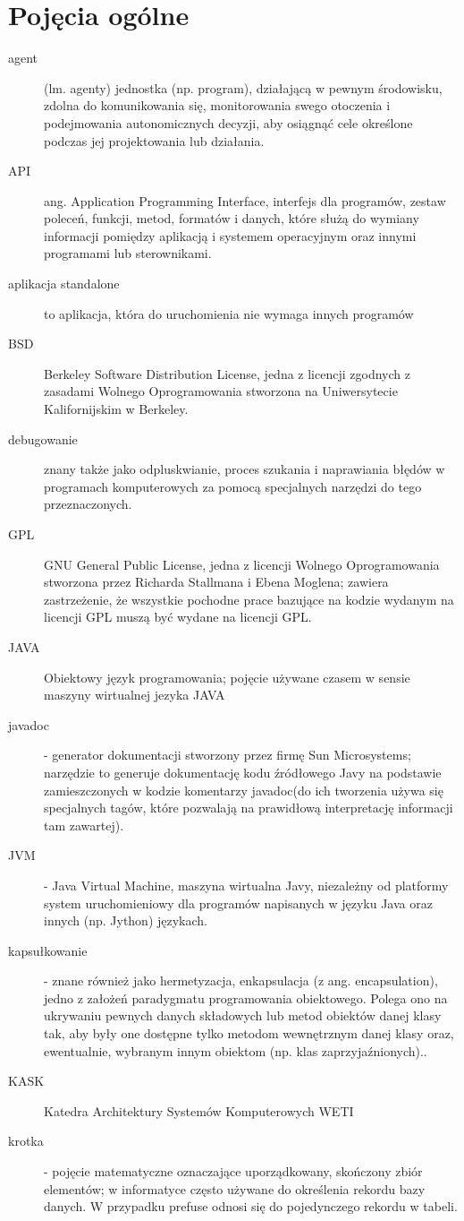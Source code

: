 \documentclass[a4paper,10pt]{article}
\begin{document}
\section{Pojęcia ogólne}
\begin{description}
	\item[agent] (lm. agenty) jednostka (np. program), działającą w pewnym środowisku, zdolna do komunikowania się, monitorowania swego otoczenia i podejmowania autonomicznych decyzji, aby osiągnąć cele określone podczas jej projektowania lub działania.
	\item[API] ang. Application Programming Interface, interfejs dla programów, zestaw poleceń, funkcji, metod, formatów i danych, które służą do wymiany informacji pomiędzy aplikacją i systemem operacyjnym oraz innymi programami lub sterownikami.
	\item[aplikacja standalone] to aplikacja, która do uruchomienia nie wymaga innych programów

	\item[BSD] Berkeley Software Distribution License, jedna z licencji zgodnych z zasadami Wolnego Oprogramowania stworzona na Uniwersytecie Kalifornijskim w Berkeley.
	\item[debugowanie] znany także jako odpluskwianie, proces szukania i naprawiania błędów	w programach komputerowych za pomocą specjalnych narzędzi do tego przeznaczonych.
	\item[GPL] GNU General Public License, jedna z licencji Wolnego Oprogramowania stworzona przez Richarda Stallmana i Ebena Moglena; zawiera zastrzeżenie, że wszystkie pochodne prace bazujące na kodzie wydanym na licencji GPL muszą być wydane na licencji GPL.

	\item[JAVA] Obiektowy język programowania; pojęcie używane czasem w sensie maszyny wirtualnej jezyka JAVA
	\item[javadoc] - generator dokumentacji stworzony przez firmę Sun Microsystems; narzędzie to generuje dokumentację kodu źródłowego Javy na podstawie zamieszczonych w kodzie komentarzy javadoc(do ich tworzenia używa się specjalnych tagów, które pozwalają na prawidłową interpretację informacji tam zawartej).
	\item[JVM] - Java Virtual Machine, maszyna wirtualna Javy, niezależny od platformy system uruchomieniowy dla programów napisanych w języku Java oraz innych (np. Jython) językach.

	\item[kapsułkowanie] - znane również jako hermetyzacja, enkapsulacja (z ang. encapsulation), jedno z założeń paradygmatu programowania obiektowego. Polega ono na ukrywaniu pewnych danych składowych lub metod obiektów danej klasy tak, aby były one dostępne tylko metodom wewnętrznym danej klasy oraz, ewentualnie, wybranym innym obiektom (np. klas zaprzyjaźnionych)..
	\item[KASK] Katedra Architektury Systemów Komputerowych WETI
	\item[krotka] - pojęcie matematyczne oznaczające uporządkowany, skończony zbiór elementów; w informatyce często używane do określenia rekordu bazy danych. W przypadku prefuse odnosi się do pojedynczego rekordu w tabeli.


\end{description}
\end{document}
